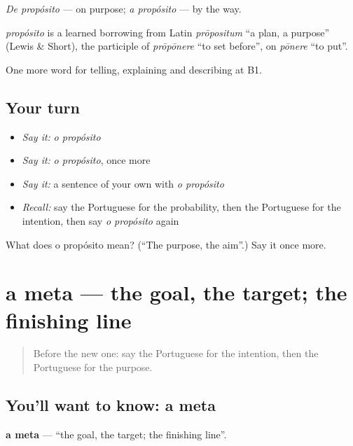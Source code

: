 \emph{De propósito} — on purpose; \emph{a propósito} — by the way.

\begin{cousinweb}
\emph{propósito} is a learned borrowing from Latin \emph{prōpositum} \textquotedblleft{}a plan, a purpose\textquotedblright{} (Lewis \& Short), the participle of \emph{prōpōnere} \textquotedblleft{}to set before\textquotedblright{}, on \emph{pōnere} \textquotedblleft{}to put\textquotedblright{}.
\end{cousinweb}

\begin{grammarlens}[title={What you've built}]
One more word for telling, explaining and describing at B1.
\end{grammarlens}

\subsection*{Your turn}
\begin{itemize}
\raggedright
  \item \emph{Say it:} \emph{o propósito}
  \item \emph{Say it:} \emph{o propósito}, once more
  \item \emph{Say it:} a sentence of your own with \emph{o propósito}
  \item \emph{Recall:} say the Portuguese for the probability, then the Portuguese for the intention, then say \emph{o propósito} again
\end{itemize}

\begin{tcolorbox}[breakable,colback=teal!4,colframe=teal!35!black,title={Before you move on}]
What does o propósito mean? (\textquotedblleft{}The purpose, the aim\textquotedblright{}.) Say it once more.
\end{tcolorbox}
\section[a meta]{a meta — the goal, the target; the finishing line}

\label{lesson:PT-C374-meta}



\begin{quote}
Before the new one: say the Portuguese for the intention, then the Portuguese for the purpose.
\end{quote}

\subsection*{You'll want to know: a meta}
\textbf{a meta} — \textquotedblleft{}the goal, the target; the finishing line\textquotedblright{}.

